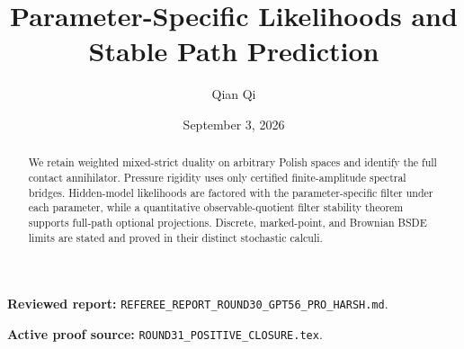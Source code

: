 \documentclass[11pt,reqno]{amsart}
\title[C2 Round 31 revision]{Parameter-Specific Likelihoods and Stable Path Prediction}
\author{Qian Qi}
\date{September 3, 2026}
\begin{document}
\begin{abstract}
We retain weighted mixed-strict duality on arbitrary Polish spaces and identify the full contact annihilator.  Pressure rigidity uses only certified finite-amplitude spectral bridges.  Hidden-model likelihoods are factored with the parameter-specific filter under each parameter, while a quantitative observable-quotient filter stability theorem supports full-path optional projections.  Discrete, marked-point, and Brownian BSDE limits are stated and proved in their distinct stochastic calculi.
\end{abstract}
\maketitle
\noindent\textbf{Reviewed report:} \texttt{REFEREE\_REPORT\_ROUND30\_GPT56\_PRO\_HARSH.md}.\par
\noindent\textbf{Active proof source:} \texttt{ROUND31\_POSITIVE\_CLOSURE.tex}.\par

\end{document}
